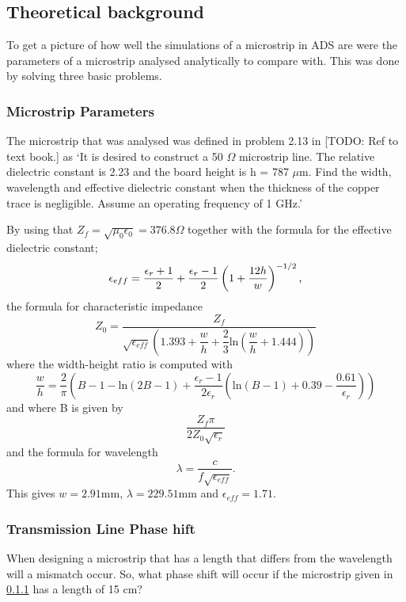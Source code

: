 \documentclass[report.tex]{subfiles}
\begin{document}
\subsection{Theoretical background}
To get a picture of how well the simulations of a microstrip in ADS are were the parameters of a microstrip analysed analytically to compare with. This was done by solving three basic problems.

\subsubsection{Microstrip Parameters}\label{subsubsec: Microstrip_Parameters}
The microstrip that was analysed was defined in problem 2.13 in [TODO: Ref to text book.] as
`It is desired to construct a 50 $\Omega$ microstrip line. The relative dielectric constant is 2.23 and the board height is h = 787 $\mu \text{m.}$ Find the width, wavelength and effective dielectric constant when the thickness of the copper trace is negligible. Assume an operating frequency of 1 GHz.'

By using that $Z_{f} = \sqrt{\mu_{0} \epsilon_{0}} = 376.8 \Omega$ together with the formula for the effective dielectric constant;
\begin{equation}
	\epsilon_{eff} = \dfrac{\epsilon_{r} + 1}{2} + \dfrac{\epsilon_{r} - 1}{2} \left(1 + {\dfrac{12 h}{w}} \right)^{-1/2} \text ,
\end{equation}
the formula for characteristic impedance
\begin{equation}
	Z_0 = \dfrac{Z_f}{\sqrt{\epsilon_{eff}}\left(1.393 + \dfrac{w}{h} + \dfrac{2}{3} \text{ln}\left(\dfrac{w}{h} + 1.444 \right)\right)}
\end{equation}
where the width-height ratio is computed with
\begin{equation}
	\dfrac{w}{h} = \dfrac{2}{\pi}\left(B - 1 - \text{ln}\left(2B - 1 \right) + \dfrac{\epsilon_r - 1}{2 \epsilon_r}\left(\text{ln}\left(B -1\right) + 0.39 - \dfrac{0.61}{\epsilon_r}\right)\right)
\end{equation}
and where B is given by
\begin{equation}
\dfrac{Z_f \pi}{2Z_0\sqrt{\epsilon_r}}
\end{equation}
and the formula for wavelength
\begin{equation}
	\lambda = \dfrac{c}{f\sqrt{\epsilon_{eff}}}.
\end{equation}
This gives $w = 2.91 \text{mm}$, $\lambda = 229.51 \text{mm}$ and $\epsilon_{eff} = 1.71 \text{.}$
\subsubsection{Transmission Line Phase hift}
When designing a microstrip that has a length that differs from the wavelength will a mismatch occur. So, what phase shift will occur if the microstrip given in \ref{subsubsec: Microstrip_Parameters} has a length of 15 cm?
\end{document}
